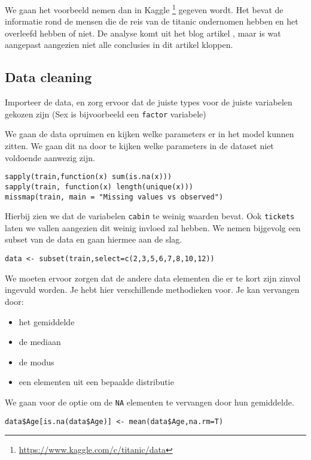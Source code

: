 We gaan het voorbeeld nemen dan in Kaggle \footnote{\href{https://www.kaggle.com/c/titanic/data}{https://www.kaggle.com/c/titanic/data}} gegeven wordt. Het bevat de informatie rond de mensen die de reis van de titanic ondernomen hebben en het overleefd hebben of niet. De analyse komt uit het blog artikel \cite{michy}, maar is wat aangepast aangezien niet alle conclusies in dit artikel kloppen. 

\subsection{Data cleaning}

Importeer de data, en zorg ervoor dat de juiste types voor de juiste variabelen gekozen zijn (Sex is bijvoorbeeld een \texttt{factor} variabele)

We gaan de data opruimen en kijken welke parameters er in het model kunnen zitten. We gaan dit na door te kijken welke parameters in de dataset niet voldoende aanwezig zijn. 

\begin{lstlisting}
sapply(train,function(x) sum(is.na(x)))
sapply(train, function(x) length(unique(x)))
missmap(train, main = "Missing values vs observed")
\end{lstlisting}
Hierbij zien we dat de variabelen \texttt{cabin} te weinig waarden bevat. Ook \texttt{tickets} laten we vallen aangezien dit weinig invloed zal hebben. 
We nemen bijgevolg een subset van de data en gaan hiermee aan de slag. 
 
\begin{lstlisting}
data <- subset(train,select=c(2,3,5,6,7,8,10,12))
\end{lstlisting} 

We moeten ervoor zorgen dat de andere data elementen die er te kort zijn zinvol ingevuld worden. Je hebt hier verschillende methodieken voor. Je kan vervangen door:
\begin{itemize}
	\item het gemiddelde
	\item de mediaan
	\item de modus
	\item een elementen uit een bepaalde distributie
\end{itemize} 

We gaan voor de optie om de \texttt{NA} elementen te vervangen door hun gemiddelde. 

\begin{lstlisting}
data$Age[is.na(data$Age)] <- mean(data$Age,na.rm=T)
\end{lstlisting}

